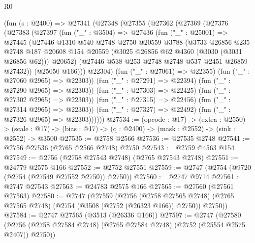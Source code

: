 \begin{lexlean}{R0}
\begin{coremodule}
        (fun (s : @2400) =>
        @27341
          (@27348
            (@27355
              (@27362
                (@27369
                  (@27376
                    (@27383
                      (@27397
                        (fun ("_" : @3504) =>
                        @27436
                          (fun ("_" : @25001) =>
                          @27445
                            (@27446
                              @1310
                              @540
                              @2748
                              @2750
                              @20559
                              @3788
                              (@3733
                                @26856
                                @235
                                @2748
                                @187
                                @20608
                                @154
                                @20559
                                (@3025 @26856 @62 @4360 (@3030 (@3031 @26856 @62)))
                                @20652)
                              (@27446 @538 @253 @2748 @2748 @537 @2451 @26859 @27432))
                            (@25050 @166)))
                        @22304)
                      (fun ("_" : @27061) => @22355)
                      (fun ("_" : @27060 @2965) => @22303))
                    (fun ("_" : @27291) => @22394)
                    (fun ("_" : @27290 @2965) => @22303))
                  (fun ("_" : @27303) => @22425)
                  (fun ("_" : @27302 @2965) => @22303))
                (fun ("_" : @27315) => @22456)
                (fun ("_" : @27314 @2965) => @22303))
              (fun ("_" : @27327) => @22492)
              (fun ("_" : @27326 @2965) => @22303))))))
@27534 := (opcode : @17) ->
  (extra : @2550) ->
  (scale : @17) -> (bias : @17) -> (q : @2400) -> (mask : @2552) -> (sink : @2552) -> @3500
@27535 := @2758 @2566
@27536 := @27535 @2748
@27541 := @2756 @27536 (@2765 @2566 @2748) @2750
@27543 := @2759 @4563 @154
@27549 := @2756 (@2758 @27543 @2748) (@2765 @27543 @2748)
@27551 := @24779 @2575 @166
@27552 := @2752 @27551
@27559 := @2747 (@2754 (@9720 (@2754 (@27549 @27552 @2750)) @2750))
@27560 := @2747 @9714
@27561 := @2747 @27543
@27563 := @24783 @2575 @166
@27565 := @27560 (@27561 @27563)
@27580 := @2747
    (@27559
      (@2756
        (@2758 @27565 @2748)
        (@2765 @27565 @2748)
        (@2754 (@3508 (@2752 (@26323 @166)) @2750))
        @2750))
@27584 := @2747 @27565 (@3513 (@26336 @166))
@27597 := @2747
    (@27580 (@2756 (@2758 @27584 @2748) (@2765 @27584 @2748) (@2752 (@25554 @2575 @2407)) @2750))

\end{coremodule}
\end{lexlean}
